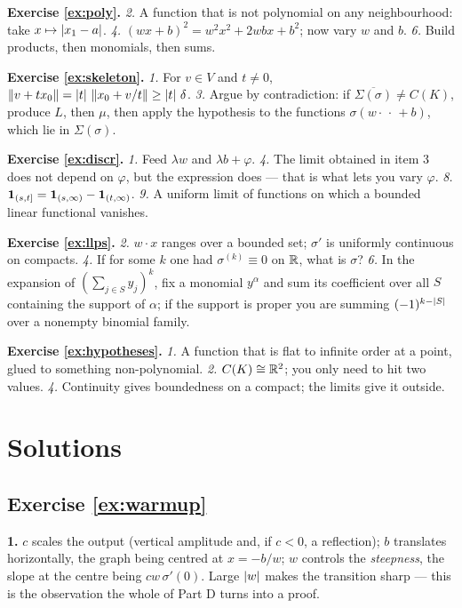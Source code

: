 \documentclass[11pt,a4paper]{article}
\begin{document}
\medskip\noindent
\textbf{Exercise \ref{ex:poly}.}
\emph{2.} A function that is not polynomial on any neighbourhood: take $x \mapsto \left\lvert x_1 - a \right\rvert$.
\emph{4.} $(wx+b)^2 = w^2x^2 + 2wbx + b^2$; now vary $w$ and $b$. \emph{6.} Build products, then
monomials, then sums.

\medskip\noindent
\textbf{Exercise \ref{ex:skeleton}.}
\emph{1.} For $v \in V$ and $t \ne 0$, $\left\lVert v + tx_0 \right\rVert = \left\lvert t \right\rvert\,\left\lVert x_0 + v/t \right\rVert \ge \left\lvert t \right\rvert\,\delta$.
\emph{3.} Argue by contradiction: if $\overline{\Sigma(\sigma)} \ne C(K)$, produce $L$, then $\mu$,
then apply the hypothesis to the functions $\sigma(w\cdot{\,\cdot\,}+b)$, which lie in
$\Sigma(\sigma)$.

\medskip\noindent
\textbf{Exercise \ref{ex:discr}.}
\emph{1.} Feed $\lambda w$ and $\lambda b + \varphi$. \emph{4.} The limit obtained in item 3 does
not depend on $\varphi$, but the expression does --- that is what lets you vary $\varphi$.
\emph{8.} $\mathbf{1}_{(s,t]} = \mathbf{1}_{(s,\infty)} - \mathbf{1}_{(t,\infty)}$. \emph{9.} A uniform limit of
functions on which a bounded linear functional vanishes.

\medskip\noindent
\textbf{Exercise \ref{ex:llps}.}
\emph{2.} $w\cdot x$ ranges over a bounded set; $\sigma'$ is uniformly continuous on compacts.
\emph{4.} If for some $k$ one had $\sigma^{(k)} \equiv 0$ on $\mathbb{R}$, what is $\sigma$?
\emph{6.} In the expansion of $(\sum_{j\in S}y_j)^k$, fix a monomial $y^\alpha$ and sum its
coefficient over all $S$ containing the support of $\alpha$; if the support is proper you are
summing $(-1)^{k-\left\lvert S \right\rvert}$ over a nonempty binomial family.

\medskip\noindent
\textbf{Exercise \ref{ex:hypotheses}.}
\emph{1.} A function that is flat to infinite order at a point, glued to something non-polynomial.
\emph{2.} $C(K) \cong \mathbb{R}^2$; you only need to hit two values. \emph{4.} Continuity gives
boundedness on a compact; the limits give it outside.


\ifsolutions
\newpage
\section{Solutions}

\subsection*{Exercise \ref{ex:warmup}}

\textbf{1.} $c$ scales the output (vertical amplitude and, if $c<0$, a reflection); $b$ translates
horizontally, the graph being centred at $x = -b/w$; $w$ controls the \emph{steepness}, the slope at
the centre being $cw\,\sigma'(0)$. Large $\left\lvert w \right\rvert$ makes the transition sharp --- this is the
observation the whole of Part D turns into a proof.
\end{document}
